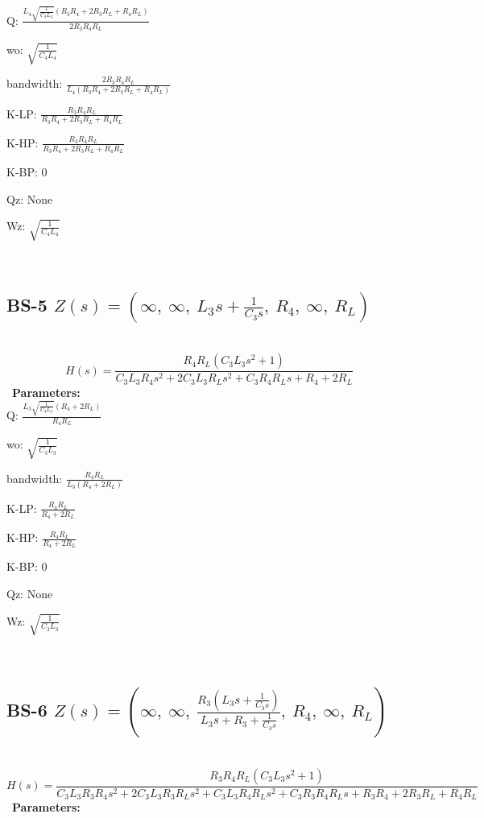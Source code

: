 \documentclass{article}
\begin{document}
Q: $\frac{L_{4} \sqrt{\frac{1}{C_{4} L_{4}}} \left(R_{3} R_{4} + 2 R_{3} R_{L} + R_{4} R_{L}\right)}{2 R_{3} R_{4} R_{L}}$\ 

wo: $\sqrt{\frac{1}{C_{4} L_{4}}}$\ 

bandwidth: $\frac{2 R_{3} R_{4} R_{L}}{L_{4} \left(R_{3} R_{4} + 2 R_{3} R_{L} + R_{4} R_{L}\right)}$\ 

K-LP: $\frac{R_{3} R_{4} R_{L}}{R_{3} R_{4} + 2 R_{3} R_{L} + R_{4} R_{L}}$\ 

K-HP: $\frac{R_{3} R_{4} R_{L}}{R_{3} R_{4} + 2 R_{3} R_{L} + R_{4} R_{L}}$\ 

K-BP: $0$\ 

Qz: $\text{None}$\ 

Wz: $\sqrt{\frac{1}{C_{4} L_{4}}}$\ 

\ 

\subsection{BS-5 $Z(s) = \left( \infty, \  \infty, \  L_{3} s + \frac{1}{C_{3} s}, \  R_{4}, \  \infty, \  R_{L}\right)$ } \ 
\textbf{\[H(s) = \frac{R_{4} R_{L} \left(C_{3} L_{3} s^{2} + 1\right)}{C_{3} L_{3} R_{4} s^{2} + 2 C_{3} L_{3} R_{L} s^{2} + C_{3} R_{4} R_{L} s + R_{4} + 2 R_{L}}\] } \ 
\textbf{Parameters:}\\ 

Q: $\frac{L_{3} \sqrt{\frac{1}{C_{3} L_{3}}} \left(R_{4} + 2 R_{L}\right)}{R_{4} R_{L}}$\ 

wo: $\sqrt{\frac{1}{C_{3} L_{3}}}$\ 

bandwidth: $\frac{R_{4} R_{L}}{L_{3} \left(R_{4} + 2 R_{L}\right)}$\ 

K-LP: $\frac{R_{4} R_{L}}{R_{4} + 2 R_{L}}$\ 

K-HP: $\frac{R_{4} R_{L}}{R_{4} + 2 R_{L}}$\ 

K-BP: $0$\ 

Qz: $\text{None}$\ 

Wz: $\sqrt{\frac{1}{C_{3} L_{3}}}$\ 

\ 

\subsection{BS-6 $Z(s) = \left( \infty, \  \infty, \  \frac{R_{3} \left(L_{3} s + \frac{1}{C_{3} s}\right)}{L_{3} s + R_{3} + \frac{1}{C_{3} s}}, \  R_{4}, \  \infty, \  R_{L}\right)$ } \ 
\textbf{\[H(s) = \frac{R_{3} R_{4} R_{L} \left(C_{3} L_{3} s^{2} + 1\right)}{C_{3} L_{3} R_{3} R_{4} s^{2} + 2 C_{3} L_{3} R_{3} R_{L} s^{2} + C_{3} L_{3} R_{4} R_{L} s^{2} + C_{3} R_{3} R_{4} R_{L} s + R_{3} R_{4} + 2 R_{3} R_{L} + R_{4} R_{L}}\] } \ 
\textbf{Parameters:}\\ 
\end{document}
